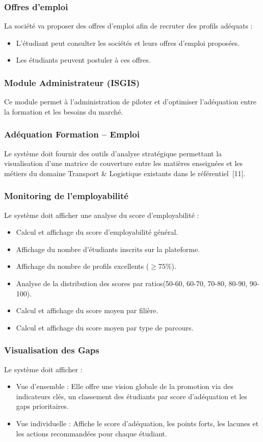 \subsubsection*{Offres d’emploi}
La société va proposer des offres d’emploi afin de recruter des profils adéquats :
 \begin{itemize}
\item L’étudiant peut consulter les sociétés et leurs offres d’emploi proposées. 
\item Les étudiants peuvent postuler à ces offres.
\end{itemize}
\subsubsection{Module Administrateur (ISGIS)}

Ce module permet à l'administration de piloter et d'optimiser l'adéquation entre la formation et les besoins du marché.

\subsubsection*{Adéquation Formation -- Emploi}
Le système doit fournir des outils d’analyse stratégique permettant la visualisation d’une matrice de couverture entre les matières enseignées et les métiers du domaine Transport \& Logistique existants dans le référentiel~[11].

\subsubsection*{Monitoring de l'employabilité}
Le système doit afficher une analyse du score d’employabilité :
\begin{itemize}
  \item Calcul et affichage du score d’employabilité général.
  \item Affichage du nombre d’étudiants inscrits sur la plateforme.
  \item Affichage du nombre de profils excellents ($\geq 75\%$).
  \item Analyse de la distribution des scores par ratios(50-60, 60-70, 70-80, 80-90, 90-100).
  \item Calcul et affichage du score moyen par filière.
  \item Calcul et affichage du score moyen par type de parcours.
\end{itemize}

\subsubsection*{Visualisation  des Gaps}
 Le système doit afficher : 
\begin{itemize}
  \item Vue d’ensemble : Elle offre une vision globale de la promotion via des indicateurs clés, un classement des étudiants par score d'adéquation et les gaps prioritaires.
  \item Vue individuelle : Affiche le score d’adéquation, les points forts, les lacunes et les actions recommandées pour chaque étudiant.

\end{itemize}
